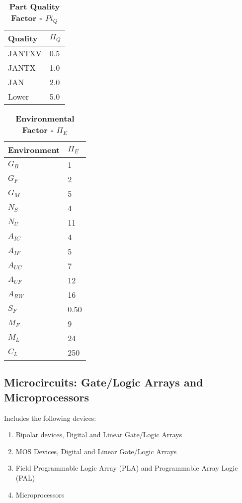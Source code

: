\begin{table}
\caption{\textbf{Part Quality  Factor -}  $Pi_{Q}$}
\label{table:baseFailRateMosHigh}
\begin{tabular}{|l|m{10cm}|} \hline
\textbf{Quality} & $\Pi_{Q}$ \\ \hline
JANTXV & 0.5 \\ \hline
JANTX & 1.0 \\ \hline
JAN & 2.0 \\ \hline
Lower & 5.0 \\ \hline
\end{tabular}
\end{table}


\begin{table}
\caption{\textbf{Environmental Factor -} $\Pi_{E}$}
\label{table:envFactorMosLow}
\begin{tabular}{|l|m{10cm}|} \hline
\textbf{Environment} & $\Pi_{E}$ \\ \hline
$G_{B}$ & 1 \\ \hline
$G_{F}$ & 2 \\ \hline
$G_{M}$ & 5 \\ \hline
$N_{S}$ & 4 \\ \hline
$N_{U}$ & 11 \\ \hline
$A_{IC}$ & 4 \\ \hline
$A_{IF}$ & 5 \\ \hline
$A_{UC}$ & 7 \\ \hline
$A_{UF}$ & 12 \\ \hline
$A_{RW}$ & 16 \\ \hline
$S_{F}$ & 0.50 \\ \hline
$M_{F}$ & 9 \\ \hline
$M_{L}$ & 24 \\ \hline
$C_{L}$ & 250 \\ \hline
\end{tabular}
\end{table}

\subsection{Microcircuits: Gate/Logic Arrays and Microprocessors}
\label{subsection:microcircuits-gatelogic-arrays-and-microprocessors}

Includes the following devices:

\begin{enumerate}
\def\labelenumi{\arabic{enumi}.}
\item  Bipolar devices, Digital and Linear Gate/Logic Arrays
\item  MOS Devices, Digital and Linear Gate/Logic Arrays
\item  Field Programmable Logic Array (PLA) and Programmable Array Logic (PAL)
\item  Microprocessors
\end{enumerate}

